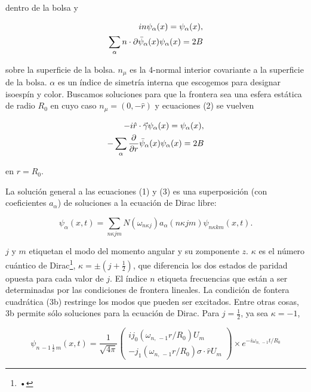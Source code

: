 dentro de la bolsa y

\begin{eqnarray}
i \sl{n} {\psi}_{\alpha} (x) = {\psi}_{\alpha} (x), \\
\sum_{\alpha} n \cdot {\partial} \bar{\psi}_{\alpha} (x) {\psi}_{\alpha} (x) = 2B
\end{eqnarray}

sobre la superficie de la bolsa. ${n}_{\mu}$ es la 4-normal interior covariante a la superficie de la bolsa. $\alpha$ es un índice de simetría interna que escogemos para designar isoespín y color. Buscamos soluciones para que la frontera sea una esfera estática de radio ${R}_{0}$ en cuyo caso ${n}_{\mu} = (0, - \hat{r})$ y ecuaciones (2) se vuelven

\begin{eqnarray}
-i \hat{r} \cdot \va{\gamma}{\psi}_{\alpha} (x) = {\psi}_{\alpha}(x), \\
-\sum_{\alpha} \frac{\partial}{\partial r} \bar{\psi}_{\alpha}(x) {\psi}_{\alpha} (x) = 2B
\end{eqnarray}

en $r= {R}_{0}$.

La solución general a las ecuaciones (1) y (3) es una superposición (con coeficientes ${a}_{\alpha}$) de soluciones a la ecuación de Dirac libre:

\begin{equation}
{\psi}_{\alpha}(x,t) = \sum_{n \kappa j m} N ({\omega}_{n \kappa j}) {a}_{\alpha} (n \kappa j m) {\psi}_{n \kappa k m} (x, t).
\end{equation}

$j$ y $m$ etiquetan el modo del momento angular y su zomponente $z$. $\kappa$ es el número cuántico de Dirac\footnote{•}, $\kappa = \pm (j + \frac{1}{2})$, que diferencia los dos estados de paridad opuesta para cada valor de $j$.  El índice $n$ etiqueta frecuencias que están a ser determinadas por las condiciones de frontera lineales. La  condición de fontera cuadrática (3b) restringe los modos que pueden ser excitados. Entre otras cosas, 3b permite sólo soluciones para la ecuación de Dirac.
Para $j = \frac{1}{2}$, ya sea $\kappa = - 1$,

\begin{equation}
{\psi}_{n \, -1 \, \frac{1}{2} \, m} (x,t) = \frac{1}{\sqrt{4 \pi}} 
\left( 
\begin{array}{c}
i {j}_{0} ({\omega}_{n, \, -1} r / {R}_{0}) {U}_{m} \\
- {j}_{1} ({\omega}_{n, \, -1} r / {R}_{0}) \sigma \cdot \hat{r}{U}_{m} 
\end{array}
\right) \times {e}^{- i {\omega}_{n, \, -1} t / {R}_{0}}
\end{equation}

